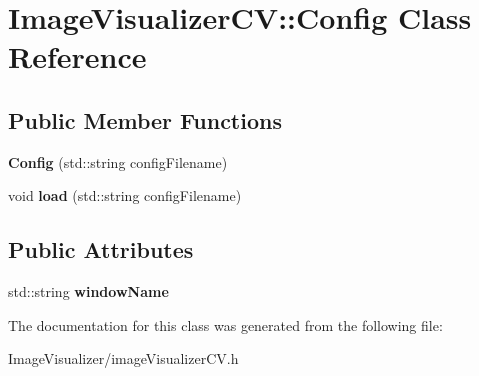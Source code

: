\hypertarget{classImageVisualizerCV_1_1Config}{}\section{Image\+Visualizer\+CV\+:\+:Config Class Reference}
\label{classImageVisualizerCV_1_1Config}
\subsection*{Public Member Functions}
\begin{DoxyCompactItemize}
\item 
{\bfseries Config} (std\+::string config\+Filename)\hypertarget{classImageVisualizerCV_1_1Config_a74ef59694b51061d0a24d8ed573e6ab2}{}\label{classImageVisualizerCV_1_1Config_a74ef59694b51061d0a24d8ed573e6ab2}

\item 
void {\bfseries load} (std\+::string config\+Filename)\hypertarget{classImageVisualizerCV_1_1Config_a28ca20a9645e13ae61def6afc12600b9}{}\label{classImageVisualizerCV_1_1Config_a28ca20a9645e13ae61def6afc12600b9}

\end{DoxyCompactItemize}
\subsection*{Public Attributes}
\begin{DoxyCompactItemize}
\item 
std\+::string {\bfseries window\+Name}\hypertarget{classImageVisualizerCV_1_1Config_a8fd9eb103656339eb36fa0b1ebd5cafb}{}\label{classImageVisualizerCV_1_1Config_a8fd9eb103656339eb36fa0b1ebd5cafb}

\end{DoxyCompactItemize}


The documentation for this class was generated from the following file\+:\begin{DoxyCompactItemize}
\item 
Image\+Visualizer/image\+Visualizer\+C\+V.\+h\end{DoxyCompactItemize}
